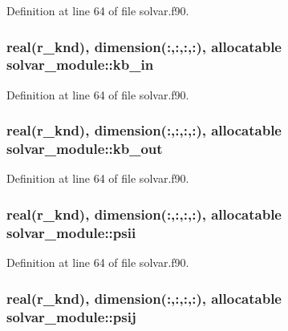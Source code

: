 Definition at line 64 of file solvar.\-f90.

\hypertarget{classsolvar__module_a7e928ad260554afcde0e80147b5176dd}{
\subsubsection[{kb\-\_\-in}]{\setlength{\rightskip}{0pt plus 5cm}real(r\-\_\-knd), dimension(\-:,\-:,\-:,\-:), allocatable solvar\-\_\-module\-::kb\-\_\-in}}\label{classsolvar__module_a7e928ad260554afcde0e80147b5176dd}


Definition at line 64 of file solvar.\-f90.

\hypertarget{classsolvar__module_a500e3ed7d4b1812584b2561e844a1a91}{
\subsubsection[{kb\-\_\-out}]{\setlength{\rightskip}{0pt plus 5cm}real(r\-\_\-knd), dimension(\-:,\-:,\-:,\-:), allocatable solvar\-\_\-module\-::kb\-\_\-out}}\label{classsolvar__module_a500e3ed7d4b1812584b2561e844a1a91}


Definition at line 64 of file solvar.\-f90.

\hypertarget{classsolvar__module_a70ce9ad936b5c35e2638616537a783be}{
\subsubsection[{psii}]{\setlength{\rightskip}{0pt plus 5cm}real(r\-\_\-knd), dimension(\-:,\-:,\-:,\-:), allocatable solvar\-\_\-module\-::psii}}\label{classsolvar__module_a70ce9ad936b5c35e2638616537a783be}


Definition at line 64 of file solvar.\-f90.

\hypertarget{classsolvar__module_af00b829c43b620a6bde607f930f7b937}{
\subsubsection[{psij}]{\setlength{\rightskip}{0pt plus 5cm}real(r\-\_\-knd), dimension(\-:,\-:,\-:,\-:), allocatable solvar\-\_\-module\-::psij}}\label{classsolvar__module_af00b829c43b620a6bde607f930f7b937}



